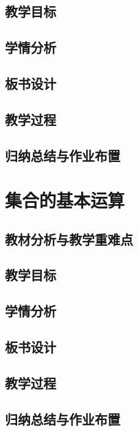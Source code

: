 \subsection{教学目标}

\subsection{学情分析}

\subsection{板书设计}

\subsection{教学过程}

\subsection{归纳总结与作业布置}

\section{集合的基本运算}
\subsection{教材分析与教学重难点}

\subsection{教学目标}

\subsection{学情分析}

\subsection{板书设计}

\subsection{教学过程}

\subsection{归纳总结与作业布置}

\section{}